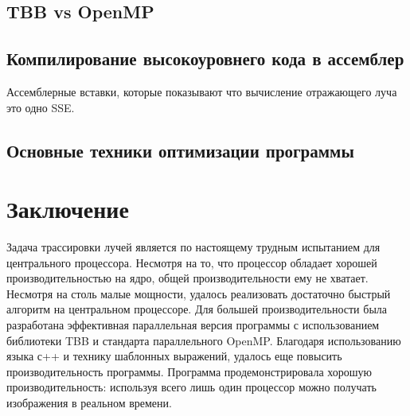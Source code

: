 \documentclass[12pt, a4paper]{article}
\begin{document}
\subsection{TBB vs OpenMP}

\subsection{Компилирование высокоуровнего кода в ассемблер}

Ассемблерные вставки, которые показывают что вычисление отражающего луча это одно SSE.

\subsection{Основные техники оптимизации программы}



\newpage
\section*{Заключение}
Задача трассировки лучей является по настоящему трудным испытанием для центрального процессора. Несмотря на то, что процессор обладает хорошей производительностью на ядро, общей производительности ему не хватает. Несмотря на столь малые мощности, удалось реализовать достаточно быстрый алгоритм на центральном процессоре. Для большей производительности была разработана эффективная параллельная версия программы с использованием библиотеки TBB и
стандарта параллельного OpenMP. Благодаря использованию языка с++ и технику шаблонных выражений, удалось еще повысить производительность программы. Программа продемонстрировала хорошую производительность: используя всего лишь один процессор можно получать изображения в реальном времени.

\end{document}
